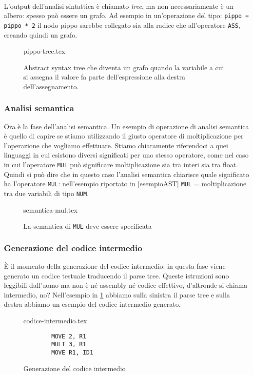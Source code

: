 \documentclass[class=book, crop=false, oneside, 12pt]{standalone}
\begin{document}
\paragraph{}
L’output dell’analisi sintattica è chiamato \emph{tree}, ma non necessariamente è un albero: spesso può essere un grafo. Ad esempio in un’operazione del tipo:
\texttt{pippo = pippo * 2}
il nodo pippo sarebbe collegato sia alla radice che all’operatore \texttt{ASS}, creando quindi un grafo.
\begin{figure}[H]
	\centering
	{pippo-tree.tex}
	\caption{Abstract syntax tree che diventa un grafo quando la variabile a cui si assegna il valore fa parte dell'espressione alla destra dell'assegnamento.}
\end{figure}

\subsubsection{Analisi semantica}
Ora è la fase dell’analisi semantica. Un esempio di operazione di analisi semantica è quello di capire se stiamo utilizzando il giusto operatore di moltiplicazione per l’operazione che vogliamo effettuare. Stiamo chiaramente riferendoci a quei linguaggi in cui esistono diversi significati per uno stesso operatore, come nel caso in cui l'operatore \texttt{MUL} può significare moltiplicazione sia tra interi sia tra float. Quindi si può dire che in questo caso l’analisi semantica chiarisce quale significato ha l’operatore \texttt{MUL}: nell’esempio riportato in \ref{esempioAST} \texttt{MUL} = moltiplicazione tra due variabili di tipo \texttt{NUM}.
\begin{figure}[H]
	\centering
	{semantica-mul.tex}
	\caption{La semantica di \texttt{MUL} deve essere specificata}
\end{figure}

\subsubsection{Generazione del codice intermedio}
È il momento della generazione del codice intermedio: in questa fase viene generato un codice testuale traducendo il parse tree. Queste istruzioni sono leggibili dall’uomo ma non è né assembly né codice effettivo, d’altronde si chiama intermedio, no? Nell'esempio in \ref{codice_intermedio} abbiamo sulla sinistra il parse tree e sulla destra abbiamo un esempio del codice intermedio generato.
\begin{figure}[H]
    \begin{minipage}{.5\textwidth}
		\raggedleft
		{codice-intermedio.tex}
	\end{minipage}
	\begin{minipage}{.5\textwidth}
		\raggedright
		\begin{verbatim}
		MOVE 2, R1
		MULT 3, R1
		MOVE R1, ID1
		\end{verbatim}
	\end{minipage}
	\caption{Generazione del codice intermedio}
	\label{codice_intermedio}
\end{figure}
\end{document}
